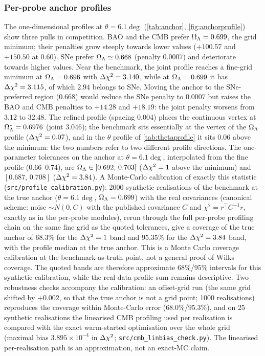 \subsubsection{Per-probe anchor profiles}\label{sec:anchor1d}
The one-dimensional profiles at $\theta=6.1\deg$ (\cref{tab:anchor}, \cref{fig:anchorprofile}) show three pulls in competition. BAO and the CMB prefer $\Omega_{\Lambda}=0.699$, the grid minimum; their penalties grow steeply towards lower values ($+100.57$ and $+150.50$ at $0.60$). SNe prefer $\Omega_{\Lambda}\simeq0.668$ (penalty $0.0007$) and deteriorate towards higher values. Near the benchmark, the joint profile reaches a fine-grid minimum at $\Omega_{\Lambda}=0.696$ with $\Delta\chi^2=3.140$, while at $\Omega_{\Lambda}=0.699$ it has $\Delta\chi^2=3.115$, of which $2.94$ belongs to SNe. Moving the anchor to the SNe-preferred region ($0.668$) would reduce the SNe penalty to $0.0007$ but raises the BAO and CMB penalties to $+14.28$ and $+18.19$: the joint penalty worsens from $3.12$ to $32.48$.
The refined profile (spacing $0.004$) places the continuous vertex at $\Omega_{\Lambda}^*=0.6976$ (joint $3.046$); the benchmark sits essentially at the vertex of the $\Omega_{\Lambda}$ profile ($\Delta\chi^2=0.07$), and in the $\theta$ profile of \cref{tab:thetaprofile} it sits $0.06$ above the minimum: the two numbers refer to two different profile directions. The one-parameter tolerances on the anchor at $\theta=6.1\deg$, interpolated from the fine profile ($0.66$--$0.74$), are $\Omega_{\Lambda}\in[0.692,\,0.703]$ ($\Delta\chi^2=1$ above the minimum) and $[0.687,\,0.708]$ ($\Delta\chi^2=3.84$). A Monte-Carlo calibration of exactly this statistic (\texttt{src/profile\_calibration.py}): 2000 synthetic realisations of the benchmark at the true anchor ($\theta=6.1\deg$, $\Omega_{\Lambda}=0.699$) with the real covariances (canonical scheme: noise $\sim N(0,C)$ with the published covariance $C$ and $\chi^2=r^{\top}C^{-1}r$, exactly as in the per-probe modules), rerun through the full per-probe profiling chain on the same fine grid as the quoted tolerances, give a coverage of the true anchor of $68.3\%$ for the $\Delta\chi^2=1$ band and $95.35\%$ for the $\Delta\chi^2=3.84$ band, with the profile median at the true anchor. This is a Monte Carlo coverage calibration at the benchmark-as-truth point, not a general proof of Wilks coverage. The quoted bands are therefore approximate $68\%$/$95\%$ intervals for this synthetic calibration, while the real-data profile sum remains descriptive. Two robustness checks accompany the calibration: an offset-grid run (the same grid shifted by $+0.002$, so that the true anchor is not a grid point; 1000 realisations) reproduces the coverage within Monte-Carlo error ($68.0\%$/$95.3\%$), and on 25 synthetic realisations the linearised CMB profiling used per realisation is compared with the exact warm-started optimisation over the whole grid (maximal bias $3.895\times10^{-4}$ in $\Delta\chi^2$; \texttt{src/cmb\_linbias\_check.py}). The linearised per-realisation path is an approximation, not an exact-MC claim.

